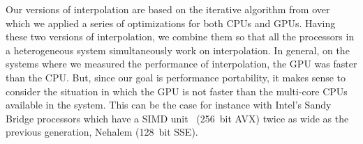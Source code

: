 Our versions of interpolation are based on the iterative algorithm from
\cite{Murarasu:2011:CDS:1941553.1941559} over which we applied a series of
optimizations for both CPUs and GPUs. Having these two versions of
interpolation, we combine them so that all the processors in a heterogeneous
system simultaneously work on interpolation. In general, on the systems where we
measured the performance of interpolation, the GPU was faster than the CPU. But,
since our goal is performance portability, it makes sense to consider the
situation in which the GPU is not faster than the multi-core CPUs available in
the system. This can be the case for instance with Intel's Sandy Bridge
processors which have a SIMD unit~\cite{avx} (256~bit AVX) twice as wide as the
previous generation, Nehalem (128~bit SSE).